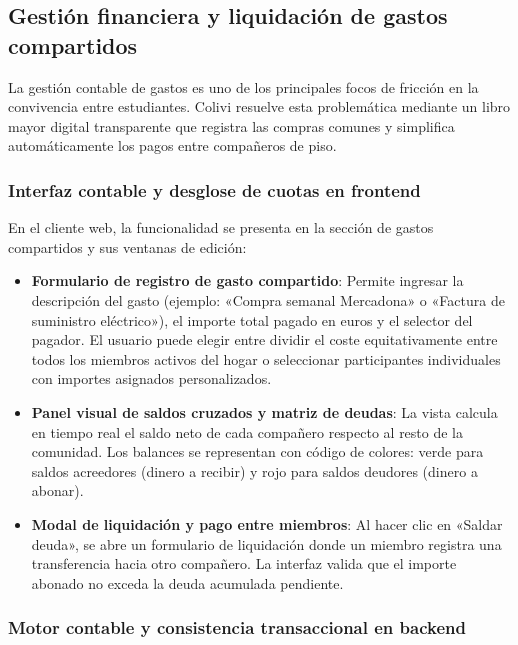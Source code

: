 \subsection{Gestión financiera y liquidación de gastos compartidos}
\label{subsec:gestion_gastos}

La gestión contable de gastos es uno de los principales focos de fricción en la convivencia entre estudiantes. Colivi resuelve esta problemática mediante un libro mayor digital transparente que registra las compras comunes y simplifica automáticamente los pagos entre compañeros de piso.

\subsubsection{Interfaz contable y desglose de cuotas en frontend}

En el cliente web, la funcionalidad se presenta en la sección de gastos compartidos y sus ventanas de edición:

\begin{itemize}
    \item \textbf{Formulario de registro de gasto compartido}: Permite ingresar la descripción del gasto (ejemplo: «Compra semanal Mercadona» o «Factura de suministro eléctrico»), el importe total pagado en euros y el selector del pagador. El usuario puede elegir entre dividir el coste equitativamente entre todos los miembros activos del hogar o seleccionar participantes individuales con importes asignados personalizados.
    \item \textbf{Panel visual de saldos cruzados y matriz de deudas}: La vista calcula en tiempo real el saldo neto de cada compañero respecto al resto de la comunidad. Los balances se representan con código de colores: verde para saldos acreedores (dinero a recibir) y rojo para saldos deudores (dinero a abonar).
    \item \textbf{Modal de liquidación y pago entre miembros}: Al hacer clic en «Saldar deuda», se abre un formulario de liquidación donde un miembro registra una transferencia hacia otro compañero. La interfaz valida que el importe abonado no exceda la deuda acumulada pendiente.
\end{itemize}

\subsubsection{Motor contable y consistencia transaccional en backend}


